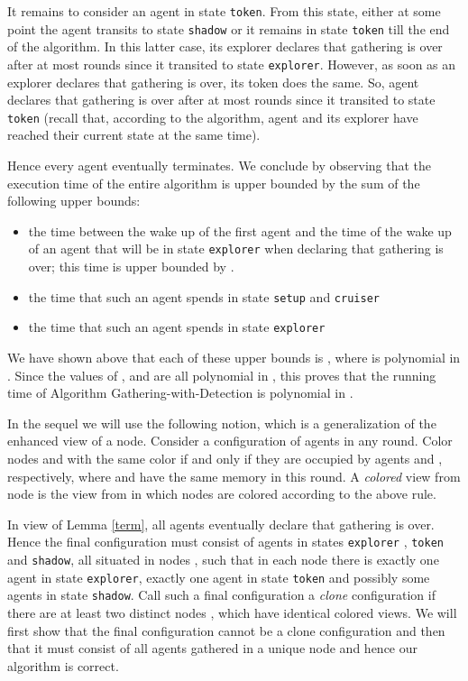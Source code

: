 \documentclass[11pt]{article}
\newcommand{\qed}{\hfill  \bigbreak}
\newenvironment{proof}{\noindent {\bf Proof.}}{\qed}
\begin{document}
\begin{proof}
  
    
  It remains to consider an agent  in state {\tt token}. 
  From this state, either at some point the agent transits to state {\tt shadow} or it remains in state {\tt token} till the end of the algorithm. 
  In this latter case, its explorer declares that gathering is over after at most { rounds} since it transited to state 
   {\tt explorer}. However, as soon as an explorer declares that gathering is over, its token does the same. So, agent  declares that gathering is over after at most  
 { rounds} since it transited to state {\tt token} (recall that, according to the algorithm, agent  and its explorer have reached their current state at the same time).
   
   Hence every agent eventually terminates.
   We conclude by observing that the execution time of the entire algorithm is upper bounded by the sum of the following upper bounds:
   \begin{itemize}
   \item
   the time between the wake up of the first agent and the time of the wake up of an agent  that will be in state {\tt explorer} when declaring that gathering is over; this time is upper bounded by {}.
   \item
   the time that such an agent  spends in state {\tt setup} and {\tt cruiser}
   \item
   the time that such an agent  spends in state {\tt explorer}
   \end{itemize}
   
   We have shown above that each of these upper bounds is {}, where  is polynomial in . Since the values of
 ,  and  are all polynomial in , this proves that the running time of  Algorithm Gathering-with-Detection is polynomial in .    
\end{proof}

In the sequel we will use the following notion, which is a generalization of the enhanced view of a node. Consider a configuration of agents in any round.
Color nodes  and  with the same color if and only if they are occupied by agents  and , respectively, where  and 
have the same memory in this round. A {\em colored} view from node  is the view from  in which nodes are colored according to the above rule. 

In view of Lemma \ref{term}, all agents eventually declare that gathering is over. Hence the final configuration must consist of agents in states  {\tt explorer} , 
{\tt token} and {\tt shadow}, all situated in nodes , such that in each node  there is exactly one agent  in state {\tt explorer}, exactly one
agent  in state {\tt token}  and possibly some agents in state  {\tt shadow}. Call such a final configuration a {\em clone} configuration if there are at least two
distinct nodes ,  which have identical colored views. We will first show that the final configuration cannot be a clone configuration
and then that it must consist of all agents
gathered in a unique node and hence our algorithm is correct. 
 
\end{document}
